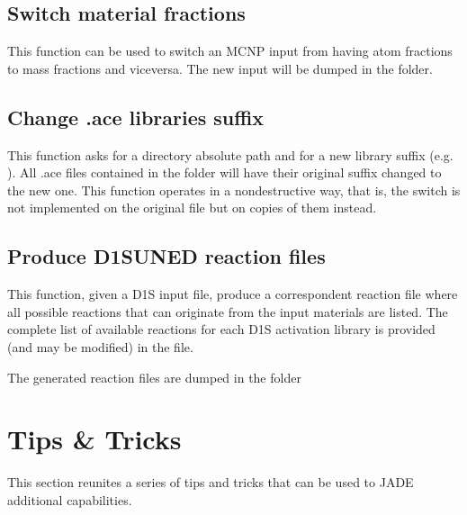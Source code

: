 \documentclass[letterpaper,10pt,english]{sphinxmanual}
\begin{document}
\section{Switch material fractions}
\label{\detokenize{usage/utilities:switch-material-fractions}}

This function can be used to switch an MCNP input from having atom fractions
to mass fractions and viceversa. The new input will be dumped in the
 folder.


\section{Change .ace libraries suffix}
\label{\detokenize{usage/utilities:change-ace-libraries-suffix}}

This function asks for a directory absolute path and for a new library suffix
(e.g. ). All .ace files contained in the folder will have their original
suffix changed to the new one. This function operates in a non\sphinxhyphen{}destructive way,
that is, the switch is not implemented on the original file but on copies of
them instead.


\section{Produce D1S\sphinxhyphen{}UNED reaction files}
\label{\detokenize{usage/utilities:produce-d1s-uned-reaction-files}}

This function, given a D1S input file, produce a correspondent reaction file
where all possible reactions that can originate from the input materials are
listed. The complete list of available reactions for each D1S activation
library is provided (and may be modified) in the 
file.

The generated reaction files are dumped in the  folder


\chapter{Tips \& Tricks}
\label{\detokenize{usage/tipstricks:tips-tricks}}\label{\detokenize{usage/tipstricks::doc}}
This section reunites a series of tips and tricks that can be used to 
JADE additional capabilities.
\end{document}
